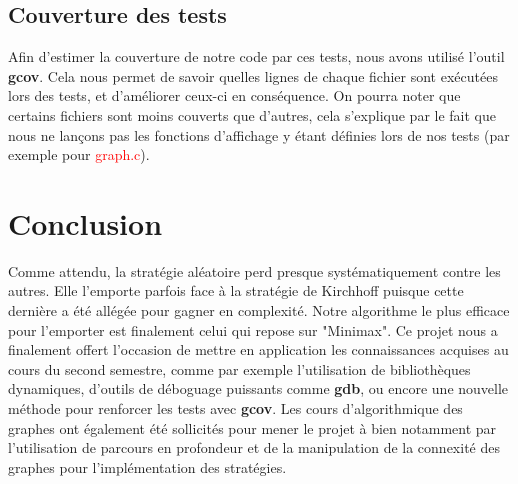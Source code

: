 \documentclass{article}
\begin{document}
\subsection{Couverture des tests}

Afin d'estimer la couverture de notre code par ces tests, nous avons utilisé l'outil \textbf{gcov}. Cela nous permet de savoir quelles lignes de chaque fichier sont exécutées lors des tests, et d'améliorer ceux-ci en conséquence. On pourra noter que certains fichiers sont moins couverts que d'autres, cela s'explique par le fait que nous ne lançons pas les fonctions d'affichage y étant définies lors de nos tests (par exemple pour \textcolor{red}{graph.c}).

\section{Conclusion} 
Comme attendu, la stratégie aléatoire perd presque systématiquement contre les autres. Elle l'emporte parfois face à la stratégie de Kirchhoff puisque cette dernière a été allégée pour gagner en complexité. Notre algorithme le plus efficace pour l'emporter est finalement celui qui repose sur "Minimax".
Ce projet nous a finalement offert l'occasion de mettre en application les connaissances acquises au cours du second semestre, comme par exemple l'utilisation de bibliothèques dynamiques, d'outils de déboguage puissants comme \textbf{gdb}, ou encore une nouvelle méthode pour renforcer les tests avec \textbf{gcov}. Les cours d'algorithmique des graphes ont également été sollicités pour mener le projet à bien notamment par l'utilisation de parcours en profondeur et de la manipulation de la connexité des graphes pour l'implémentation des stratégies.

\label{LastPage}
\end{document}
